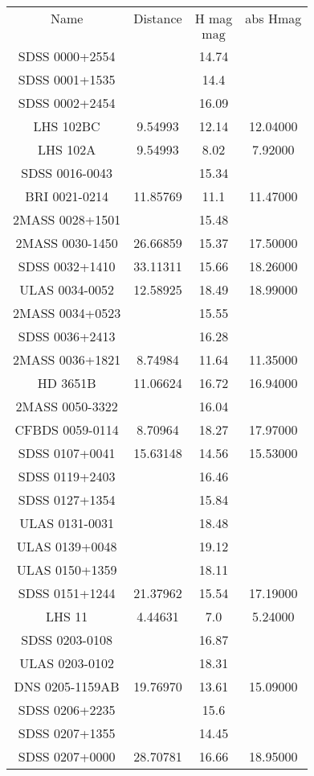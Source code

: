 \begin{table}
\begin{tabular}{cccc}
Name & Distance & H mag & abs Hmag \\
 &  & $\mathrm{mag}$ &  \\
SDSS 0000+2554 &  & 14.74 &  \\
SDSS 0001+1535 &  & 14.4 &  \\
SDSS 0002+2454 &  & 16.09 &  \\
LHS 102BC & 9.54993 & 12.14 & 12.04000 \\
LHS 102A & 9.54993 & 8.02 & 7.92000 \\
SDSS 0016-0043 &  & 15.34 &  \\
BRI 0021-0214 & 11.85769 & 11.1 & 11.47000 \\
2MASS 0028+1501 &  & 15.48 &  \\
2MASS 0030-1450 & 26.66859 & 15.37 & 17.50000 \\
SDSS 0032+1410 & 33.11311 & 15.66 & 18.26000 \\
ULAS 0034-0052 & 12.58925 & 18.49 & 18.99000 \\
2MASS 0034+0523 &  & 15.55 &  \\
SDSS 0036+2413 &  & 16.28 &  \\
2MASS 0036+1821 & 8.74984 & 11.64 & 11.35000 \\
HD 3651B & 11.06624 & 16.72 & 16.94000 \\
2MASS 0050-3322 &  & 16.04 &  \\
CFBDS 0059-0114 & 8.70964 & 18.27 & 17.97000 \\
SDSS 0107+0041 & 15.63148 & 14.56 & 15.53000 \\
SDSS 0119+2403 &  & 16.46 &  \\
SDSS 0127+1354 &  & 15.84 &  \\
ULAS 0131-0031 &  & 18.48 &  \\
ULAS 0139+0048 &  & 19.12 &  \\
ULAS 0150+1359 &  & 18.11 &  \\
SDSS 0151+1244 & 21.37962 & 15.54 & 17.19000 \\
LHS 11 & 4.44631 & 7.0 & 5.24000 \\
SDSS 0203-0108 &  & 16.87 &  \\
ULAS 0203-0102 &  & 18.31 &  \\
DNS 0205-1159AB & 19.76970 & 13.61 & 15.09000 \\
SDSS 0206+2235 &  & 15.6 &  \\
SDSS 0207+1355 &  & 14.45 &  \\
SDSS 0207+0000 & 28.70781 & 16.66 & 18.95000 \\

\end{tabular}
\end{table}
